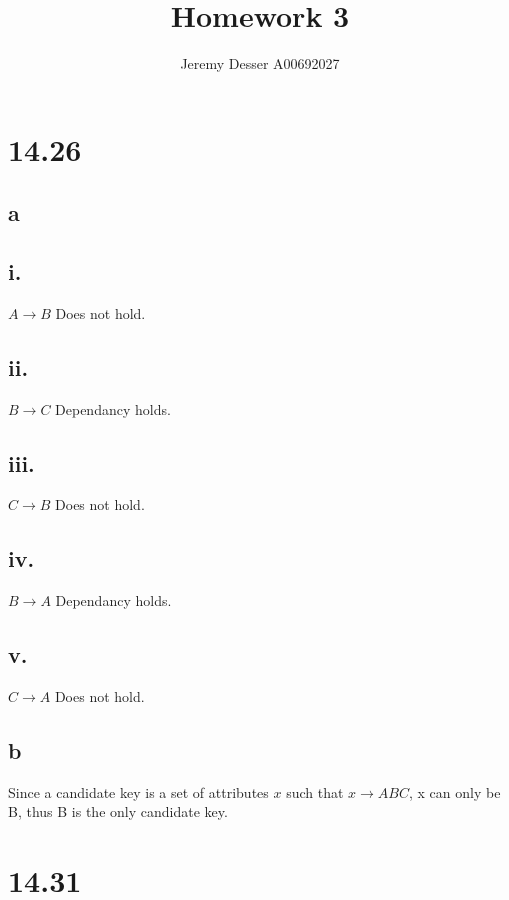 \documentclass[11pt]{article}
\theoremstyle{plain}
\theoremstyle{definition}
\begin{document}
 


\title{Homework 3}
\author{Jeremy Desser A00692027}
\begin{titlepage}
\maketitle
\end{titlepage}



\section*{14.26}

\subsection*{a}
\subsection*{i.} $A \rightarrow B $ Does not hold.\\
\subsection*{ii.} $B \rightarrow C $ Dependancy holds.\\
\subsection*{iii.} $C \rightarrow B $ Does not hold.\\
\subsection*{iv.} $B \rightarrow A $ Dependancy holds.\\
\subsection*{v.} $C \rightarrow A $ Does not hold.\\
\subsection*{b}
 Since a candidate key  is a set of attributes $x$ such that $x \rightarrow ABC$, x can only be B, thus B is the only candidate key.\\
 \newpage
\section*{14.31}
\end{document}
